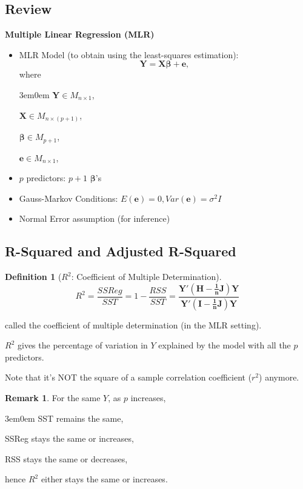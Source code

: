 \documentclass[11pt]{article}
\newenvironment{indentone}{\begin{adjustwidth}{3em}{0em}}{\end{adjustwidth}}
\newcommand\VEC{\bm}{}
\theoremstyle{definition}
\newtheorem{definition}{Definition}[section]
\newtheorem{remark}{Remark}[section]
\numberwithin{equation}{section}
\begin{document}
\subsection{Review}
\textbf{Multiple Linear Regression (MLR)}
\begin{itemize}
\item MLR Model (to obtain using the least-squares estimation):
\begin{equation}
  \VEC{Y} = \VEC{X\beta} + \VEC{e},
\end{equation}
where
\begin{indentone}
$\VEC{Y}\in M_{n\times 1}$, 

$\VEC{X}\in M_{n\times(p+1)}$,

$\VEC{\beta}\in M_{p+1}$,

$\VEC{e}\in M_{n\times 1}$,

\end{indentone}

\item $p$ predictors: $p+1$ $\VEC{\beta}$'s
\item Gauss-Markov Conditions: $E(\VEC{e})=0, Var(\VEC{e})=\sigma^2 I$
\item Normal Error assumption (for inference)
\end{itemize}

\subsection{R-Squared and Adjusted R-Squared}

\begin{definition}[$R^2$: Coefficient of Multiple Determination]
  \begin{equation}
  R^2=\frac{SSReg}{SST}=1-\frac{RSS}{SST} = \frac{\VEC{Y'(H-\frac{1}{n} J)Y}}{\VEC{Y'(I-\frac{1}{n}J)Y}}
  \end{equation}

  called the coefficient of multiple determination (in the MLR setting).

  $R^2$ gives the percentage of variation in $Y$ explained by the model with all the $p$ predictors.
\end{definition}
\begin{writenotes}
  Note that it's NOT the square of a sample correlation coefficient ($r^2$) anymore.
\end{writenotes}

\begin{remark}
For the same $Y$, as $p$ increases, 

\begin{indentone}
  SST remains the same,

  SSReg stays the same or increases,

  RSS stays the same or decreases, 
\end{indentone}

hence $R^2$ either stays the same or increases.
\end{remark}
\end{document}
